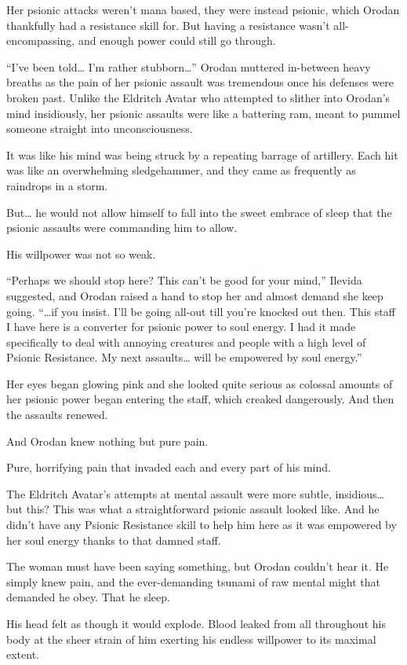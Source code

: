 \documentclass[a4paper,10pt]{book}
\begin{document}
Her psionic attacks weren’t mana based, they were instead psionic, which Orodan thankfully had a resistance skill for. But having a resistance wasn’t all-encompassing, and enough power could still go through.\par
“I’ve been told… I’m rather stubborn…” Orodan muttered in-between heavy breaths as the pain of her psionic assault was tremendous once his defenses were broken past. Unlike the Eldritch Avatar who attempted to slither into Orodan’s mind insidiously, her psionic assaults were like a battering ram, meant to pummel someone straight into unconsciousness.\par
It was like his mind was being struck by a repeating barrage of artillery. Each hit was like an overwhelming sledgehammer, and they came as frequently as raindrops in a storm.\par
But… he would not allow himself to fall into the sweet embrace of sleep that the psionic assaults were commanding him to allow.\par
His willpower was not so weak.\par
“Perhaps we should stop here? This can’t be good for your mind,” Ilevida suggested, and Orodan raised a hand to stop her and almost demand she keep going. “…if you insist. I’ll be going all-out till you’re knocked out then. This staff I have here is a converter for psionic power to soul energy. I had it made specifically to deal with annoying creatures and people with a high level of Psionic Resistance. My next assaults… will be empowered by soul energy.”\par
Her eyes began glowing pink and she looked quite serious as colossal amounts of her psionic power began entering the staff, which creaked dangerously. And then the assaults renewed.\par
And Orodan knew nothing but pure pain.\par
Pure, horrifying pain that invaded each and every part of his mind.\par
The Eldritch Avatar’s attempts at mental assault were more subtle, insidious… but this? This was what a straightforward psionic assault looked like. And he didn’t have any Psionic Resistance skill to help him here as it was empowered by her soul energy thanks to that damned staff.\par
The woman must have been saying something, but Orodan couldn’t hear it. He simply knew pain, and the ever-demanding tsunami of raw mental might that demanded he obey. That he sleep.\par
His head felt as though it would explode. Blood leaked from all throughout his body at the sheer strain of him exerting his endless willpower to its maximal extent.\par
\end{document}
